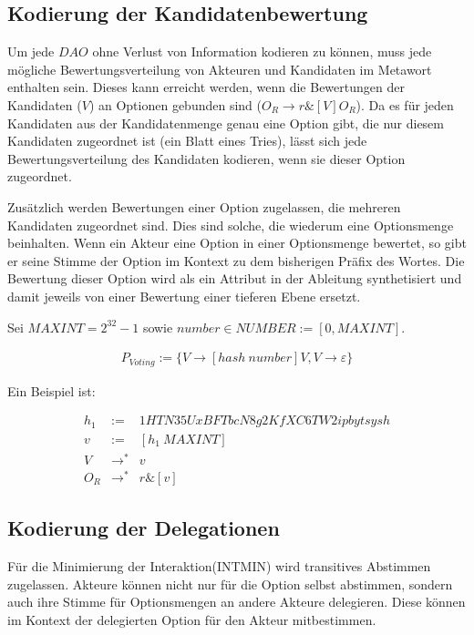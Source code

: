 \documentclass[a4paper,12pt]{report}
\begin{document}
\subsection{Kodierung der Kandidatenbewertung}
Um jede $DAO$ ohne Verlust von Information kodieren zu können, muss jede mögliche Bewertungsverteilung von Akteuren und Kandidaten im Metawort enthalten sein. 
Dieses kann erreicht werden, wenn die Bewertungen der Kandidaten ($V$) an Optionen gebunden sind ($O_R \rightarrow r\& [V] O_R$). Da es für jeden Kandidaten aus der Kandidatenmenge genau eine Option gibt, die nur diesem Kandidaten zugeordnet ist (ein Blatt eines Tries), lässt sich jede Bewertungsverteilung des Kandidaten kodieren, wenn sie dieser Option zugeordnet. 

Zusätzlich werden Bewertungen einer Option zugelassen, die mehreren Kandidaten zugeordnet sind. Dies sind solche, die wiederum eine Optionsmenge beinhalten. Wenn ein Akteur eine Option in einer Optionsmenge bewertet, so gibt er seine Stimme der Option im Kontext zu dem bisherigen Präfix des Wortes.
Die Bewertung dieser Option wird als ein Attribut in der Ableitung synthetisiert\cite{Knuth1968} und damit jeweils von einer Bewertung einer tieferen Ebene ersetzt.

Sei $MAXINT = 2^{32}-1$ sowie $number\in NUMBER:=[0,MAXINT]$.



\begin{eqnarray}
P_{Voting} := \{V\rightarrow [hash\ number]V, V \rightarrow \varepsilon\}
\end{eqnarray}
  
 Ein Beispiel ist:

\begin{eqnarray}
  h_1 &:=& 1HTN35UxBFTbcN8g2KfXC6TW2ipbytsysh\\
  v &:=& [h_1\ MAXINT] \\
  V &\rightarrow^*& v \\
  O_R &\rightarrow^*& r\&[v]
\end{eqnarray}



\subsection{Kodierung der Delegationen}

Für die Minimierung der Interaktion(INTMIN) wird transitives Abstimmen zugelassen. Akteure können nicht nur für die Option selbst abstimmen, sondern auch ihre Stimme für Optionsmengen an andere Akteure delegieren. Diese können im Kontext der delegierten Option für den Akteur mitbestimmen.
\end{document}
